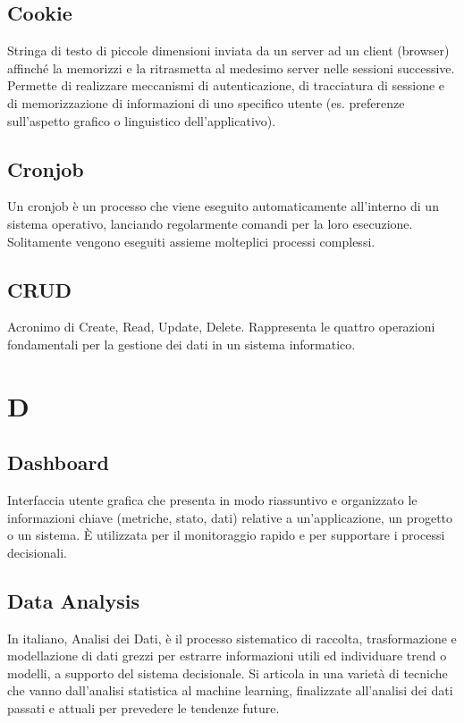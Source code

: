 \documentclass[10pt, letterpaper]{article}
\begin{document}
\subsection*{Cookie}
Stringa di testo di piccole dimensioni inviata da un server ad un client (browser) affinché la memorizzi e la ritrasmetta al medesimo server nelle sessioni successive. Permette di realizzare meccanismi di autenticazione, di tracciatura di sessione e di memorizzazione di informazioni di uno specifico utente (es. preferenze sull'aspetto grafico o linguistico dell'applicativo).

\subsection*{Cronjob}
Un cronjob è un processo che viene eseguito automaticamente all'interno di un sistema operativo,
 lanciando regolarmente comandi per la loro esecuzione. Solitamente vengono eseguiti assieme molteplici processi complessi.

\subsection*{CRUD}
Acronimo di Create, Read, Update, Delete. Rappresenta le quattro operazioni fondamentali per la gestione dei dati in un sistema informatico.

\section{D}

\subsection*{Dashboard}
Interfaccia utente grafica che presenta in modo riassuntivo e organizzato le informazioni chiave (metriche, stato, dati) relative a un'applicazione, un progetto
o un sistema. È utilizzata per il monitoraggio rapido e per supportare i processi decisionali.

\subsection*{Data Analysis}
In italiano, Analisi dei Dati, è il processo sistematico di raccolta, trasformazione e modellazione di dati grezzi per estrarre informazioni utili ed individuare
trend o modelli, a supporto del sistema decisionale. Si articola in una varietà di tecniche che vanno dall'analisi statistica al machine learning, finalizzate all'analisi
dei dati passati e attuali per prevedere le tendenze future.
\end{document}
